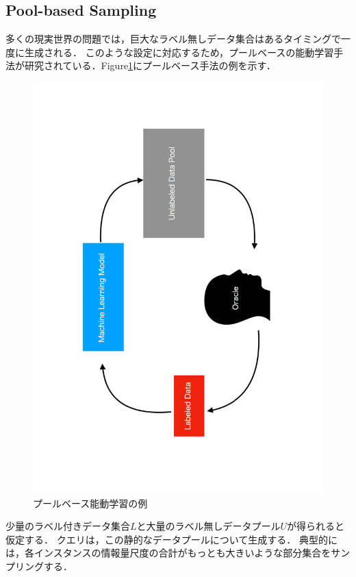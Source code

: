 \documentclass[11pt]{report}
\begin{document}
\subsection{Pool-based Sampling}
多くの現実世界の問題では，巨大なラベル無しデータ集合はあるタイミングで一度に生成される．
このような設定に対応するため，プールベースの能動学習手法が研究されている．Figure\ref{fig1}にプールベース手法の例を示す．

\begin{figure}[h]
\begin{center}
\includegraphics[bb=0 0 500 850, scale=0.4, angle=270]{./images/fig1.pdf}
\vspace{5mm}
\caption{プールベース能動学習の例}
\label{fig1}
\end{center}
\end{figure}

少量のラベル付きデータ集合$L$と大量のラベル無しデータプール$U$が得られると仮定する．
クエリは，この静的なデータプールについて生成する．
典型的には，各インスタンスの情報量尺度の合計がもっとも大きいような部分集合をサンプリングする．
\end{document}
